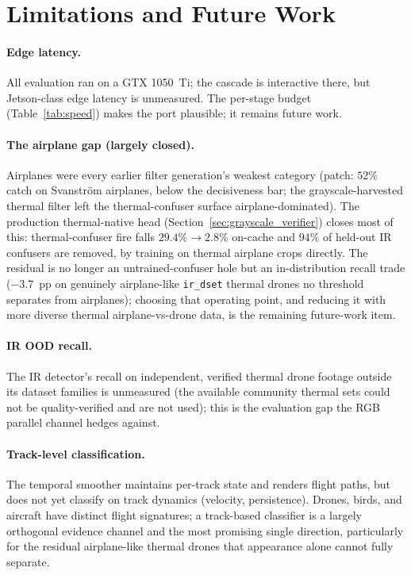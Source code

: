 \section{Limitations and Future Work}
\label{sec:limits}

\paragraph{Edge latency.} All evaluation ran on a GTX 1050~Ti; the cascade is interactive there, but Jetson-class edge latency is unmeasured. The per-stage budget (Table~\ref{tab:speed}) makes the port plausible; it remains future work.

\paragraph{The airplane gap (largely closed).} Airplanes were every earlier filter generation's weakest category (patch: $52\%$ catch on Svanstr\"om airplanes, below the decisiveness bar; the grayscale-harvested thermal filter left the thermal-confuser surface airplane-dominated). The production thermal-native head (Section~\ref{sec:grayscale_verifier}) closes most of this: thermal-confuser fire falls $29.4\% \to 2.8\%$ on-cache and $94\%$ of held-out IR confusers are removed, by training on thermal airplane crops directly. The residual is no longer an untrained-confuser hole but an in-distribution recall trade ($-3.7$~pp on genuinely airplane-like \texttt{ir\_dset} thermal drones no threshold separates from airplanes); choosing that operating point, and reducing it with more diverse thermal airplane-vs-drone data, is the remaining future-work item.

\paragraph{IR OOD recall.} The IR detector's recall on independent, verified thermal drone footage outside its dataset families is unmeasured (the available community thermal sets could not be quality-verified and are not used); this is the evaluation gap the RGB parallel channel hedges against.

\paragraph{Track-level classification.} The temporal smoother maintains per-track state and renders flight paths, but does not yet classify on track dynamics (velocity, persistence). Drones, birds, and aircraft have distinct flight signatures; a track-based classifier is a largely orthogonal evidence channel and the most promising single direction, particularly for the residual airplane-like thermal drones that appearance alone cannot fully separate.

